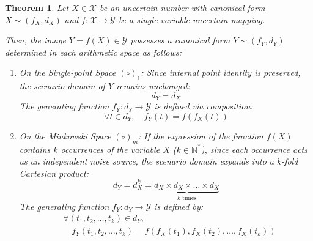 \documentclass[a4paper,12pt,twoside]{memoir}
\newtheorem{theorem}{Theorem}[chapter]
\begin{document}
	\begin{theorem}
		\label{dl:3.2}
		Let $X \in \mathcal{X}$ be an uncertain number with canonical form $X \sim (f_X, d_X)$ and $f: \mathcal{X} \rightarrow \mathcal{Y}$ be a single-variable uncertain mapping.
		
		Then, the image $Y = f(X) \in \mathcal{Y}$ possesses a canonical form $Y \sim (f_Y, d_Y)$ determined in each arithmetic space as follows:
		
		\begin{enumerate}[leftmargin=*]
			\item On the Single-point Space $(\circ)_1$:
			Since internal point identity is preserved, the scenario domain of $Y$ remains unchanged:
			\[
			d_Y = d_X
			\]
			The generating function $f_Y: d_Y \rightarrow \mathcal{Y}$ is defined via composition:
			\[
			\forall t \in d_Y, \quad f_Y(t) = f(f_X(t))
			\]
			
			\item On the Minkowski Space $(\circ)_m$:
			If the expression of the function $f(X)$ contains $k$ occurrences of the variable $X$ ($k \in \mathbb{N}^*$), since each occurrence acts as an independent noise source, the scenario domain expands into a $k$-fold Cartesian product:
			\[
			d_Y = d_X^k = \underbrace{d_X \times d_X \times \dots \times d_X}_{k \text{ times}}
			\]
			The generating function $f_Y: d_Y \rightarrow \mathcal{Y}$ is defined by:
			\begin{align*}
				&\forall (t_1, t_2, \dots, t_k) \in d_Y, \\
				&\quad f_Y(t_1, t_2, \dots, t_k) = f\left(f_X(t_1), f_X(t_2), \dots, f_X(t_k)\right)
			\end{align*}
		\end{enumerate}
	\end{theorem}
\end{document}
